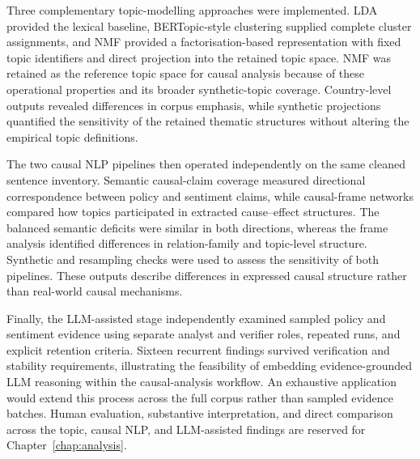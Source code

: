 Three complementary topic-modelling approaches were implemented. LDA provided the
lexical baseline, BERTopic-style clustering supplied complete cluster assignments,
and NMF provided a factorisation-based representation with fixed topic identifiers
and direct projection into the retained topic space. NMF was retained as the
reference topic space for causal analysis because of these operational properties
and its broader synthetic-topic coverage. Country-level outputs revealed differences
in corpus emphasis, while synthetic projections quantified the sensitivity of the
retained thematic structures without altering the empirical topic definitions.

The two causal NLP pipelines then operated independently on the same cleaned sentence
inventory. Semantic causal-claim coverage measured directional correspondence between
policy and sentiment claims, while causal-frame networks compared how topics
participated in extracted cause--effect structures. The balanced semantic deficits
were similar in both directions, whereas the frame analysis identified differences
in relation-family and topic-level structure. Synthetic and resampling checks were
used to assess the sensitivity of both pipelines. These outputs describe differences
in expressed causal structure rather than real-world causal mechanisms.

Finally, the LLM-assisted stage independently examined sampled policy and sentiment
evidence using separate analyst and verifier roles, repeated runs, and explicit
retention criteria. Sixteen recurrent findings survived verification and stability
requirements, illustrating the feasibility of embedding evidence-grounded LLM
reasoning within the causal-analysis workflow. An exhaustive application would extend
this process across the full corpus rather than sampled evidence batches. Human
evaluation, substantive interpretation, and direct comparison across the topic,
causal NLP, and LLM-assisted findings are reserved for
Chapter~\ref{chap:analysis}.